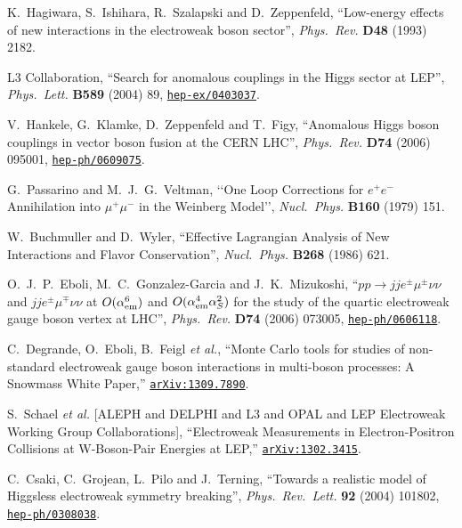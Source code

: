\documentclass[english,12pt]{article}
\begin{document}
\begin{thebibliography}{10}
K.~Hagiwara, S.~Ishihara, R.~Szalapski and D.~Zeppenfeld, ``{Low-energy effects
  of new interactions in the electroweak boson sector}'', {\em Phys.\ Rev.} {\bf
  D48} (1993) 2182.

{L3} Collaboration, ``{Search for anomalous couplings in
  the Higgs sector at LEP}'', {\em Phys.\ Lett.} {\bf B589} (2004) 89,
\href{http://www.arXiv.org/abs/hep-ex/0403037}{{\tt hep-ex/0403037}}.

V.~Hankele, G.~Klamke, D.~Zeppenfeld and T.~Figy, ``{Anomalous Higgs boson
  couplings in vector boson fusion at the CERN LHC}'', {\em Phys.\ Rev.} {\bf
  D74} (2006) 095001,
\href{http://www.arXiv.org/abs/hep-ph/0609075}{{\tt hep-ph/0609075}}.

  G.~Passarino and M.~J.~G.~Veltman,
  `{`One Loop Corrections for $e^+e^-$ Annihilation into $\mu^+\mu^-$ in the Weinberg
  Model}'',
  {\em Nucl.\ Phys.}  {\bf B160} (1979) 151.

W.~Buchmuller and D.~Wyler, ``{Effective Lagrangian Analysis of New Interactions
  and Flavor Conservation}'', {\em Nucl.\ Phys.} {\bf B268} (1986)
621.

O.~J.~P.~Eboli, M.~C.~Gonzalez-Garcia and J.~K.~Mizukoshi, 
                  ``{$p p \to j j e^\pm \mu^\pm \nu \nu$ and $j j e^\pm \mu^\mp \nu \nu$ at
                  $O(\alpha_{\rm em}^6)$ and $O(\alpha_{\rm em}^4 \alpha_S^2)$ for the
                  study of the quartic electroweak gauge boson vertex at
                  LHC}'', {\em Phys.\ Rev.} {\bf D74} (2006) 073005,
\href{http://www.arXiv.org/abs/hep-ph/0606118}{{\tt hep-ph/0606118}}.

  C.~Degrande, O.~Eboli, B.~Feigl {\it et al.},
  ``Monte Carlo tools for studies of non-standard electroweak gauge boson interactions in multi-boson processes: A Snowmass White Paper,''
  \href{http://arxiv.org/abs/1309.7890}{{\tt arXiv:1309.7890}}.

  S.~Schael {\it et al.}  [ALEPH and DELPHI and L3 and OPAL and LEP Electroweak Working Group Collaborations],
  ``Electroweak Measurements in Electron-Positron Collisions at W-Boson-Pair Energies at LEP,''
  \href{http://arxiv.org/abs/1302.3415}{{\tt arXiv:1302.3415}}.

C.~Csaki, C.~Grojean, L.~Pilo and J.~Terning, ``{Towards a realistic model of
  Higgsless electroweak symmetry breaking}'', {\em Phys.\ Rev.\ Lett.} {\bf 92}
  (2004) 101802,
\href{http://www.arXiv.org/abs/hep-ph/0308038}{{\tt hep-ph/0308038}}.


\end{thebibliography}
\end{document}
